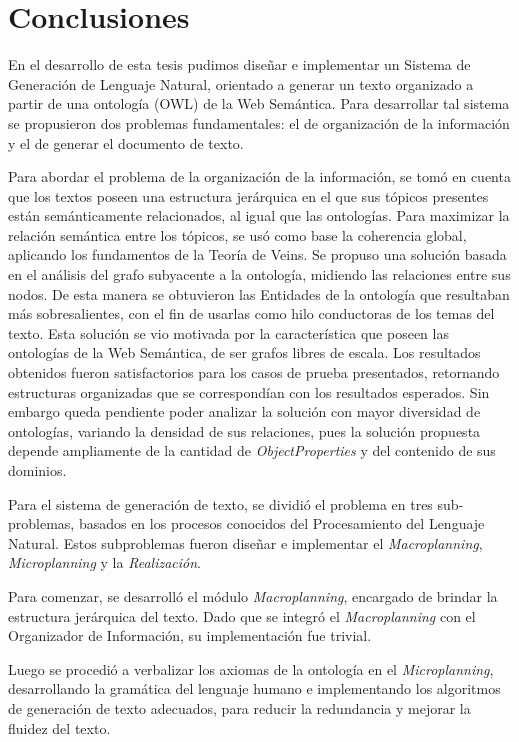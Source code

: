 \chapter{Conclusiones}
En el desarrollo de esta tesis pudimos diseñar e implementar un Sistema de Generación de Lenguaje Natural, orientado a generar un texto organizado a partir de una ontología (OWL) de la Web Semántica. Para desarrollar tal sistema se propusieron dos problemas fundamentales: el de organización de la información y el de generar el documento de texto. 

Para abordar el problema de la organización de la información, se tomó en cuenta que los textos poseen una estructura jerárquica en el que sus tópicos presentes están semánticamente relacionados, al igual que las ontologías. Para maximizar la relación semántica entre los tópicos, se usó como base la coherencia global, aplicando los fundamentos de la Teoría de Veins. Se propuso una solución basada en el análisis del grafo subyacente a la ontología, midiendo las relaciones entre sus nodos. De esta manera se obtuvieron las Entidades de la ontología que resultaban más sobresalientes, con el fin de usarlas como hilo conductoras de los temas del texto.
Esta solución se vio motivada por la característica que poseen las ontologías de la Web Semántica, de ser grafos libres de escala. Los resultados obtenidos fueron satisfactorios para los casos de prueba presentados, retornando estructuras organizadas que se correspondían con los resultados esperados. Sin embargo queda pendiente poder analizar la solución con mayor diversidad de ontologías, variando la densidad de sus relaciones, pues la solución propuesta depende ampliamente de la cantidad de \emph{ObjectProperties} y del contenido de sus dominios.

Para el sistema de generación de texto, se dividió el problema en tres sub-problemas, basados en los procesos conocidos del Procesamiento del Lenguaje Natural. Estos subproblemas fueron diseñar e implementar el \emph{Macroplanning}, \emph{Microplanning} y la \emph{Realización}. 

Para comenzar, se desarrolló el módulo \emph{Macroplanning}, encargado de brindar la estructura jerárquica del texto. Dado que se integró el \emph{Macroplanning} con el Organizador de Información, su implementación fue trivial.

Luego se procedió a verbalizar los axiomas de la ontología en el \emph{Microplanning}, desarrollando la gramática del lenguaje humano e implementando los algoritmos de generación de texto adecuados, para reducir la redundancia y mejorar la fluidez del texto. 

